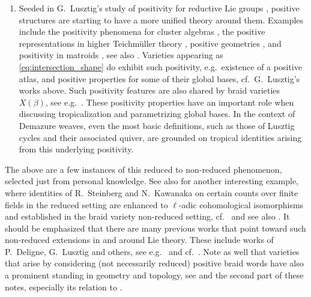 \begin{enumerate}
    \item Seeded in G.~Lusztig's study of positivity for reductive Lie groups \cite{Lusztig,Lusztig1997PositivityBases,Lusztig1998,Lusztig2019PositivityII,Lusztig2025Survey}, positive structures are starting to have a more unified theory around them. Examples include the positivity phenomena for cluster algebras \cite{FZ1999,Fomin2010,FominLusztig2022,FZ2000Tests,BFZ1996,BZ1997,LS2015,MSW2011,Davison2018,DM2021}, the positive representations in higher Teichm\"uller theory \cite{FG2006,MR2221137}, positive geometries \cite{ABL2017,ABHY2018,ALS2021,Lam2024Invitation,Lam2025Moduli}, and positivity in matroids \cite{ARW2017}, see also \cite{KW2014}. Varieties appearing as \eqref{eq:intersection_shape} do exhibit such positivity, e.g.~existence of a positive atlas, and positive properties for some of their global bases, cf.~G.~Lusztig's works above. Such positivity features are also shared by braid varieties $X(\beta)$, see e.g.~\cite{BaoHe2022TwistedPositivity}. These positivity properties have an important role when discussing tropicalization and parametrizing global bases. In the context of Demazure weaves, even the most basic definitions, such as those of Lusztig cycles and their associated quiver, are grounded on tropical identities arising from this underlying positivity.\\
\end{enumerate}

\noindent The above are a few instances of this reduced to non-reduced phenomenon, selected just from personal knowledge. See also \cite{trinh2021heckecategoryunipotentlocus,trinh2022unipotentelementstwistinglink} for another interesting example, where identities of R.~Steinberg \cite[Theorem 15.1]{Steinberg1968Endomorphisms} and N.~Kawanaka \cite[Theorem 4.1]{Kawanaka1975} on certain counts over finite fields in the reduced setting are enhanced to $\ell$-adic cohomological isomorphisms and established in the braid variety non-reduced setting, cf.~\cite[Corollary 4]{trinh2021heckecategoryunipotentlocus} and see also \cite[Conjectures 1 \& 17]{trinh2022unipotentelementstwistinglink}. It should be emphasized that there are many previous works that point toward such non-reduced extensions in and around Lie theory. These include works of P.~Deligne, G.~Lusztig and others, see e.g.~\cite{Deligne1972Tresses,Deligne1997Action,DeligneLusztig1976Representations,BroueMichel1997Regular,DigneMichelRouquier2007Cohomologie,Lusztig2011Varieties} and cf.~\cite[Appendix B]{trinh2021heckecategoryunipotentlocus}. Note as well that varieties that arise by considering (not necessarily reduced) positive braid words have also a prominent standing in geometry and topology, see \cite{Bott1956Morse,BottSamelson1958Morse,Demazure1974Desingularisation,LakshmibaiLittelmannMagyar2002SMT} and the second part of these notes, especially its relation to \cite{FG2006}.

